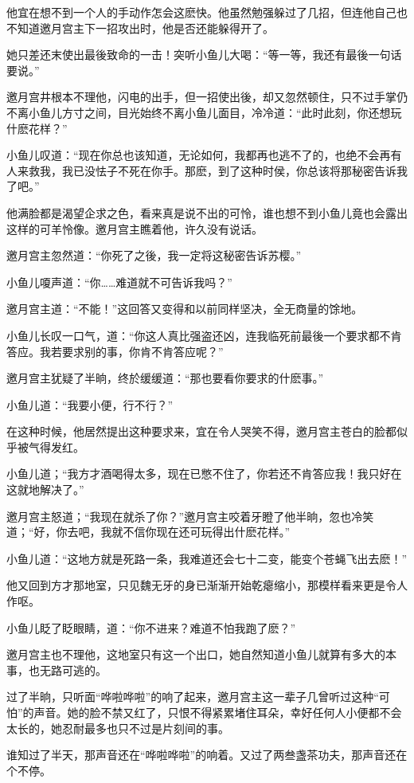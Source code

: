 \documentclass[12pt,oneside]{book}
\begin{document}
他宜在想不到一个人的手动作怎会这麽快。他虽然勉强躲过了几招，但连他自己也不知道邀月宫主下一招攻出时，他是否还能躲得开了。

她只差还末使出最後致命的一击！突听小鱼儿大喝：``等一等，我还有最後一句话要说。''

邀月宫井根本不理他，闪电的出手，但一招使出後，却又忽然顿住，只不过手掌仍不离小鱼儿方寸之间，目光始终不离小鱼儿面目，冷冷道：``此时此刻，你还想玩什麽花样？''

小鱼儿叹道：``现在你总也该知道，无论如何，我都再也逃不了的，也绝不会再有人来救我，我已没怯子不死在你手。那麽，到了这种时侯，你总该将那秘密告诉我了吧。''

他满脸都是渴望企求之色，看来真是说不出的可怜，谁也想不到小鱼儿竟也会露出这样的可羊怜像。邀月宫主瞧着他，许久没有说话。

邀月宫主忽然道：``你死了之後，我一定将这秘密告诉苏樱。''

小鱼儿嗄声道：``你\ldots\ldots 难道就不可告诉我吗？''

邀月宫主道：``不能！''这回答又变得和以前同样坚决，全无商量的馀地。

小鱼儿长叹一口气，道：``你这人真比强盗还凶，连我临死前最後一个要求都不肯答应。我若要求别的事，你肯不肯答应呢？''

邀月宫主犹疑了半晌，终於缓缓道：``那也要看你要求的什麽事。''

小鱼儿道：``我要小便，行不行？''

在这种时候，他居然提出这种要求来，宜在令人哭笑不得，邀月宫主苍白的脸都似乎被气得发红。

小鱼儿道；``我方才酒喝得太多，现在已憋不住了，你若还不肯答应我！我只好在这就地解决了。''

邀月宫主怒道；``我现在就杀了你？''邀月宫主咬着牙瞪了他半晌，忽也冷笑道；``好，你去吧，我就不信你现在还可玩得出什麽花样。''

小鱼儿道：``这地方就是死路一条，我难道还会七十二变，能变个苍蝇飞出去麽！''

他又回到方才那地室，只见魏无牙的身已渐渐开始乾瘪缩小，那模样看来更是令人作呕。

小鱼儿眨了眨眼睛，道：``你不进来？难道不怕我跑了麽？''

邀月宫主也不理他，这地室只有这一个出口，她自然知道小鱼儿就算有多大的本事，也无路可逃的。

过了半晌，只听面``哗啦哗啦''的响了起来，邀月宫主这一辈子几曾听过这种``可怕''的声音。她的脸不禁又红了，只恨不得紧累堵住耳朵，幸好任何人小便都不会太长的，她忍耐最多也只不过是片刻间的事。

谁知过了半天，那声音还在``哗啦哗啦''的响着。又过了两叁盏茶功夫，那声音还在个不停。
\end{document}
